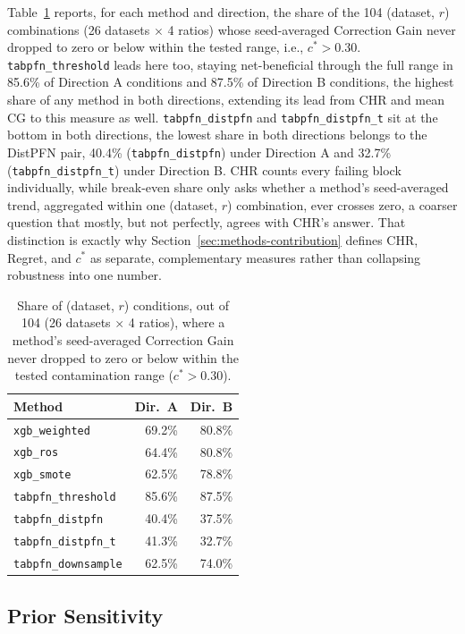 Table~\ref{tab:breakeven} reports, for each method and direction, the share
of the 104 (dataset, $r$) combinations (26 datasets $\times$ 4 ratios)
whose seed-averaged Correction
Gain never dropped to zero or below within the tested range, i.e., $c^*>0.30$.
\texttt{tabpfn\_threshold} leads here too, staying net-beneficial through
the full range in 85.6\% of Direction A conditions and 87.5\% of Direction B
conditions, the highest share of any method in both directions, extending
its lead from CHR and mean CG to this measure as well.
\texttt{tabpfn\_distpfn} and \texttt{tabpfn\_distpfn\_t} sit at the
bottom in both directions, the lowest
share in both directions belongs to the DistPFN pair, 40.4\%
(\texttt{tabpfn\_distpfn}) under Direction A and 32.7\%
(\texttt{tabpfn\_distpfn\_t}) under Direction B. CHR counts every
failing block individually, while break-even share only asks whether a
method's seed-averaged trend, aggregated within one (dataset, $r$)
combination, ever crosses zero, a coarser question that mostly, but not
perfectly, agrees with CHR's answer. That distinction is exactly why
Section~\ref{sec:methods-contribution} defines CHR, Regret, and $c^*$ as
separate, complementary measures rather than collapsing robustness into one
number.

\begin{table}[t]
\centering
\caption{Share of (dataset, $r$) conditions, out of 104 (26 datasets
$\times$ 4 ratios), where a method's seed-averaged
Correction Gain never dropped to zero or below within the tested
contamination range ($c^*>0.30$).}
\label{tab:breakeven}
\begin{tabular}{@{}lrr@{}}
\toprule
Method & Dir.\ A & Dir.\ B \\
\midrule
\texttt{xgb\_weighted}      & 69.2\% & 80.8\% \\
\texttt{xgb\_ros}           & 64.4\% & 80.8\% \\
\texttt{xgb\_smote}         & 62.5\% & 78.8\% \\
\texttt{tabpfn\_threshold}  & 85.6\% & 87.5\% \\
\texttt{tabpfn\_distpfn}    & 40.4\% & 37.5\% \\
\texttt{tabpfn\_distpfn\_t} & 41.3\% & 32.7\% \\
\texttt{tabpfn\_downsample} & 62.5\% & 74.0\% \\
\bottomrule
\end{tabular}
\end{table}

\subsection{Prior Sensitivity}
\label{sec:results-rq4}

